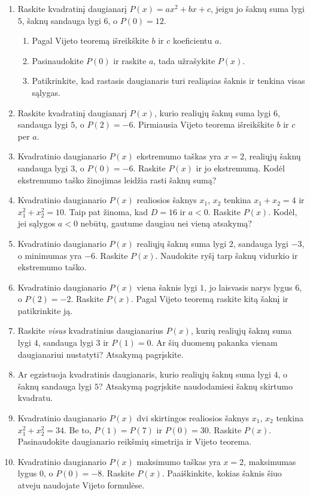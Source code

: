 \documentclass[12pt,a4paper]{article}
\begin{document}
\begin{enumerate}[resume=uzdaviniai]
\item Raskite kvadratinį daugianarį $P(x)=ax^2+bx+c$, jeigu jo šaknų suma lygi $5$, šaknų sandauga lygi $6$, o $P(0)=12$.
\begin{enumerate}
\item Pagal Vijeto teoremą išreikškite $b$ ir $c$ koeficientu $a$.
\item Pasinaudokite $P(0)$ ir raskite $a$, tada užrašykite $P(x)$.
\item Patikrinkite, kad rastasis daugianaris turi realiąsias šaknis ir tenkina visas sąlygas.
\end{enumerate}
\item Raskite kvadratinį daugianarį $P(x)$, kurio realiųjų šaknų suma lygi $6$, sandauga lygi $5$, o $P(2)=-6$. Pirmiausia Vijeto teorema išreikškite $b$ ir $c$ per $a$.
\item Kvadratinio daugianario $P(x)$ ekstremumo taškas yra $x=2$, realiųjų šaknų sandauga lygi $3$, o $P(0)=-6$. Raskite $P(x)$ ir jo ekstremumą. Kodėl ekstremumo taško žinojimas leidžia rasti šaknų sumą?
\item Kvadratinio daugianario $P(x)$ realiosios šaknys $x_1$, $x_2$ tenkina $x_1+x_2=4$ ir $x_1^2+x_2^2=10$. Taip pat žinoma, kad $D=16$ ir $a<0$. Raskite $P(x)$. Kodėl, jei sąlygos $a<0$ nebūtų, gautume daugiau nei vieną atsakymą?
\item Kvadratinio daugianario $P(x)$ realiųjų šaknų suma lygi $2$, sandauga lygi $-3$, o minimumas yra $-6$. Raskite $P(x)$. Naudokite ryšį tarp šaknų vidurkio ir ekstremumo taško.
\item Kvadratinio daugianario $P(x)$ viena šaknis lygi $1$, jo laisvasis narys lygus $6$, o $P(2)=-2$. Raskite $P(x)$. Pagal Vijeto teoremą raskite kitą šaknį ir patikrinkite ją.
\item Raskite \emph{visus} kvadratinius daugianarius $P(x)$, kurių realiųjų šaknų suma lygi $4$, sandauga lygi $3$ ir $P(1)=0$. Ar šių duomenų pakanka vienam daugianariui nustatyti? Atsakymą pagrįskite.
\item Ar egzistuoja kvadratinis daugianaris, kurio realiųjų šaknų suma lygi $4$, o šaknų sandauga lygi $5$? Atsakymą pagrįskite naudodamiesi šaknų skirtumo kvadratu.
\item Kvadratinio daugianario $P(x)$ dvi skirtingos realiosios šaknys $x_1$, $x_2$ tenkina $x_1^2+x_2^2=34$. Be to, $P(1)=P(7)$ ir $P(0)=30$. Raskite $P(x)$. Pasinaudokite daugianario reikšmių simetrija ir Vijeto teorema.
\item Kvadratinio daugianario $P(x)$ maksimumo taškas yra $x=2$, maksimumas lygus $0$, o $P(0)=-8$. Raskite $P(x)$. Paaiškinkite, kokias šaknis šiuo atveju naudojate Vijeto formulėse.
\end{enumerate}
\end{document}

